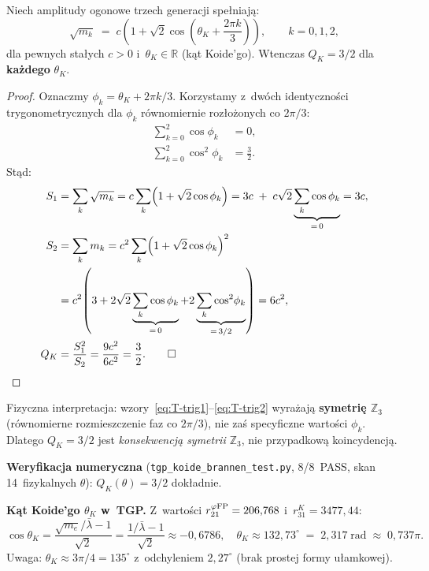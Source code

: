 \begin{proposition}[$Q_K = 3/2$ z~symetrii $\mathbb{Z}_3$ --- parametryzacja Brannena]%
\label{prop:T-Brannen-Z3}
Niech amplitudy ogonowe trzech generacji spe\l{}niaj\k{a}:
\begin{equation}\label{eq:T-Brannen}
  \sqrt{m_k} \;=\; c\!\left(1 + \sqrt{2}\cos\!\left(\theta_K + \frac{2\pi k}{3}\right)\right),
  \qquad k = 0, 1, 2,
\end{equation}
dla pewnych sta\l{}ych $c > 0$ i~$\theta_K \in \mathbb{R}$ (k\k{a}t Koide'go).
Wtenczas $Q_K = 3/2$ dla \textbf{ka\.zdego} $\theta_K$.

\begin{proof}
Oznaczmy $\phi_k = \theta_K + 2\pi k/3$. Korzystamy z~dw\'och
identyczno\'sci trygonometrycznych dla $\phi_k$ r\'ownomiernie
roz\l{}o\.zonych co $2\pi/3$:
\begin{align}
  \sum_{k=0}^{2} \cos\phi_k &= 0, \label{eq:T-trig1}\\
  \sum_{k=0}^{2} \cos^2\!\phi_k &= \tfrac{3}{2}. \label{eq:T-trig2}
\end{align}
St\k{a}d:
\begin{align}
  S_1 &= \sum_k\sqrt{m_k} = c\sum_k\!\left(1+\sqrt{2}\cos\phi_k\right)
        = 3c \;+\; c\sqrt{2}\underbrace{\sum_k\cos\phi_k}_{=\,0} = 3c, \\
  S_2 &= \sum_k m_k = c^2\sum_k\!\left(1+\sqrt{2}\cos\phi_k\right)^2 \notag\\
       &= c^2\!\left(3 + 2\sqrt{2}\underbrace{\sum_k\cos\phi_k}_{=\,0}
          + 2\underbrace{\sum_k\cos^2\!\phi_k}_{=\,3/2}\right) = 6c^2, \\
  Q_K &= \frac{S_1^2}{S_2} = \frac{9c^2}{6c^2} = \frac{3}{2}. \qquad \square
\end{align}
\end{proof}

Fizyczna interpretacja: wzory~\eqref{eq:T-trig1}--\eqref{eq:T-trig2}
wyra\.zaj\k{a} \textbf{symetri\k{e} $\mathbb{Z}_3$} (r\'ownomierne
rozmieszczenie faz co $2\pi/3$), nie za\'s specyficzne warto\'sci
$\phi_k$. Dlatego $Q_K = 3/2$ jest \emph{konsekwencj\k{a} symetrii
$\mathbb{Z}_3$}, nie przypadkow\k{a} koincydencj\k{a}.

\textbf{Weryfikacja numeryczna} (\texttt{tgp\_koide\_brannen\_test.py},
8/8~PASS, skan 14~fizykalnych $\theta$): $Q_K(\theta) = 3/2$ dok\l{}adnie.

\textbf{K\k{a}t Koide'go $\theta_K$ w~TGP.}
Z~warto\'sci $r_{21}^{\varphi{\rm FP}} = 206{,}768$ i~$r_{31}^K = 3477{,}44$:
\begin{equation}\label{eq:T-thetaK}
  \cos\theta_K
  = \frac{\sqrt{m_e}/\bar\lambda - 1}{\sqrt{2}}
  = \frac{1/\bar\lambda - 1}{\sqrt{2}}
  \approx -0{,}6786,
  \quad
  \theta_K \approx 132{,}73^\circ
  \;=\; 2{,}317\;\mathrm{rad}
  \;\approx\; 0{,}737\pi.
\end{equation}
Uwaga: $\theta_K \approx 3\pi/4 = 135^\circ$ z~odchyleniem $2{,}27^\circ$
(brak prostej formy ułamkowej).


\end{proposition}
